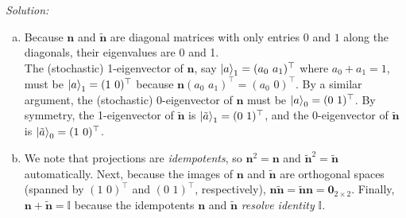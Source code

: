 \documentclass{book}
\theoremstyle{definition}
\newcommand{\Id}{\mathbb{I}}
\begin{document}
\noindent \textit{Solution:} 
\begin{enumerate}[(a)]
	\item Because $\mathbf{n}$ and $\tilde{\mathbf{n}}$ are diagonal matrices with only entries $0$ and $1$ along the diagonals, their eigenvalues are 0 and 1. \\
	
	The (stochastic) 1-eigenvector of $\mathbf{n}$, say $\ket{a}_1= (a_0\,\,a_1)^\top$ where $a_0 + a_1 = 1$, must be ${\ket{a}_1 = (1\,\,0)^\top}$ because $\mathbf{n}(a_0\,\,a_1)^\top = (a_0\,\,0)^\top$. By a similar argument, the (stochastic) 0-eigenvector of $\mathbf{n}$ must be ${\ket{a}_0 = (0\,\,1)^\top}$. By symmetry, the 1-eigenvector of $\tilde{\mathbf{n}}$ is ${\ket{\tilde{a}}_{{1}} = (0\,\,1)^\top}$, and the 0-eigenvector of $\tilde{\mathbf{n}}$ is ${\ket{\tilde{a}}_{{0}} = (1\,\,0)^\top}$.
	
	\item We note that projections are \textit{idempotents}, so $\mathbf{n}^2 = \mathbf{n}$ and $\tilde{\mathbf{n}}^2 = \tilde{\mathbf{n}}$ automatically. Next, because the images of $\mathbf{n}$ and $\tilde{\mathbf{n}}$ are orthogonal spaces (spanned by $(1\,\,0)^\top$ and $(0\,\,1)^\top$, respectively), $\mathbf{n}\tilde{\mathbf{n}} = \tilde{\mathbf{n}}\mathbf{n} = \mathbf{0}_{2\times 2}$. Finally, $\mathbf{n} + \tilde{\mathbf{n}} = \Id$ because the idempotents $\mathbf{n}$ and $\tilde{\mathbf{n}}$ \textit{resolve identity} $\Id$. \\
	

\end{enumerate}
\end{document}
